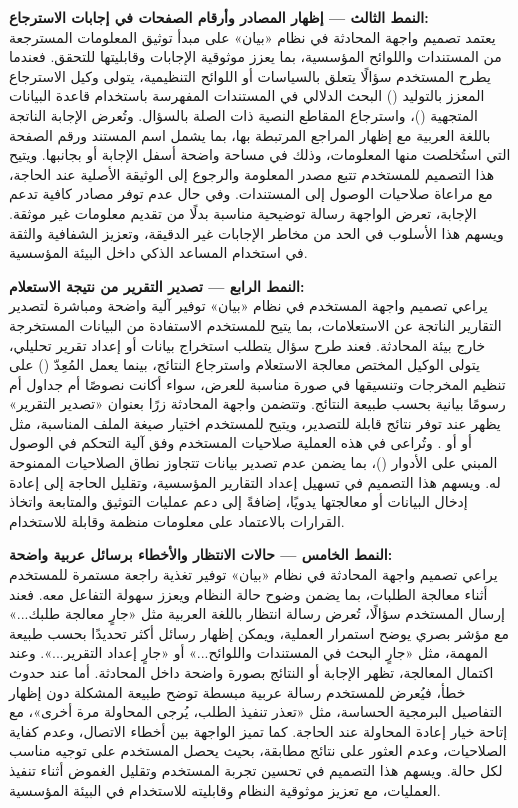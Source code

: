 \textbf{النمط الثالث — إظهار المصادر وأرقام الصفحات في إجابات الاسترجاع:}\\
يعتمد تصميم واجهة المحادثة في نظام «بيان» على مبدأ توثيق المعلومات المسترجعة من المستندات واللوائح المؤسسية، بما يعزز موثوقية الإجابات وقابليتها للتحقق. فعندما يطرح المستخدم سؤالًا يتعلق بالسياسات أو اللوائح التنظيمية، يتولى وكيل الاسترجاع المعزز بالتوليد () البحث الدلالي في المستندات المفهرسة باستخدام قاعدة البيانات المتجهية ()، واسترجاع المقاطع النصية ذات الصلة بالسؤال. وتُعرض الإجابة الناتجة باللغة العربية مع إظهار المراجع المرتبطة بها، بما يشمل اسم المستند ورقم الصفحة التي استُخلصت منها المعلومات، وذلك في مساحة واضحة أسفل الإجابة أو بجانبها. ويتيح هذا التصميم للمستخدم تتبع مصدر المعلومة والرجوع إلى الوثيقة الأصلية عند الحاجة، مع مراعاة صلاحيات الوصول إلى المستندات. وفي حال عدم توفر مصادر كافية تدعم الإجابة، تعرض الواجهة رسالة توضيحية مناسبة بدلًا من تقديم معلومات غير موثقة. ويسهم هذا الأسلوب في الحد من مخاطر الإجابات غير الدقيقة، وتعزيز الشفافية والثقة في استخدام المساعد الذكي داخل البيئة المؤسسية.

\textbf{النمط الرابع — تصدير التقرير من نتيجة الاستعلام:}\\
يراعي تصميم واجهة المستخدم في نظام «بيان» توفير آلية واضحة ومباشرة لتصدير التقارير الناتجة عن الاستعلامات، بما يتيح للمستخدم الاستفادة من البيانات المستخرجة خارج بيئة المحادثة. فعند طرح سؤال يتطلب استخراج بيانات أو إعداد تقرير تحليلي، يتولى الوكيل المختص معالجة الاستعلام واسترجاع النتائج، بينما يعمل المُعِدّ () على تنظيم المخرجات وتنسيقها في صورة مناسبة للعرض، سواء أكانت نصوصًا أم جداول أم رسومًا بيانية بحسب طبيعة النتائج. وتتضمن واجهة المحادثة زرًا بعنوان «تصدير التقرير» يظهر عند توفر نتائج قابلة للتصدير، ويتيح للمستخدم اختيار صيغة الملف المناسبة، مثل  أو  أو . وتُراعى في هذه العملية صلاحيات المستخدم وفق آلية التحكم في الوصول المبني على الأدوار ()، بما يضمن عدم تصدير بيانات تتجاوز نطاق الصلاحيات الممنوحة له. ويسهم هذا التصميم في تسهيل إعداد التقارير المؤسسية، وتقليل الحاجة إلى إعادة إدخال البيانات أو معالجتها يدويًا، إضافةً إلى دعم عمليات التوثيق والمتابعة واتخاذ القرارات بالاعتماد على معلومات منظمة وقابلة للاستخدام.

\textbf{النمط الخامس — حالات الانتظار والأخطاء برسائل عربية واضحة:}\\
يراعي تصميم واجهة المحادثة في نظام «بيان» توفير تغذية راجعة مستمرة للمستخدم أثناء معالجة الطلبات، بما يضمن وضوح حالة النظام ويعزز سهولة التفاعل معه. فعند إرسال المستخدم سؤالًا، تُعرض رسالة انتظار باللغة العربية مثل «جارٍ معالجة طلبك...» مع مؤشر بصري يوضح استمرار العملية، ويمكن إظهار رسائل أكثر تحديدًا بحسب طبيعة المهمة، مثل «جارٍ البحث في المستندات واللوائح...» أو «جارٍ إعداد التقرير...». وعند اكتمال المعالجة، تظهر الإجابة أو النتائج بصورة واضحة داخل المحادثة. أما عند حدوث خطأ، فيُعرض للمستخدم رسالة عربية مبسطة توضح طبيعة المشكلة دون إظهار التفاصيل البرمجية الحساسة، مثل «تعذر تنفيذ الطلب، يُرجى المحاولة مرة أخرى»، مع إتاحة خيار إعادة المحاولة عند الحاجة. كما تميز الواجهة بين أخطاء الاتصال، وعدم كفاية الصلاحيات، وعدم العثور على نتائج مطابقة، بحيث يحصل المستخدم على توجيه مناسب لكل حالة. ويسهم هذا التصميم في تحسين تجربة المستخدم وتقليل الغموض أثناء تنفيذ العمليات، مع تعزيز موثوقية النظام وقابليته للاستخدام في البيئة المؤسسية.

